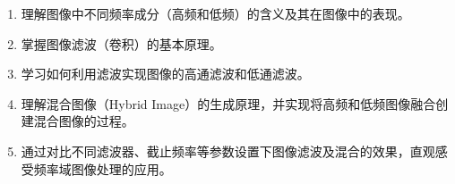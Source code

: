 \begin{enumerate}
    \item 理解图像中不同频率成分（高频和低频）的含义及其在图像中的表现。
    \item 掌握图像滤波（卷积）的基本原理。
    \item 学习如何利用滤波实现图像的高通滤波和低通滤波。
    \item 理解混合图像（Hybrid Image）的生成原理，并实现将高频和低频图像融合创建混合图像的过程。
    \item 通过对比不同滤波器、截止频率等参数设置下图像滤波及混合的效果，直观感受频率域图像处理的应用。
\end{enumerate}
